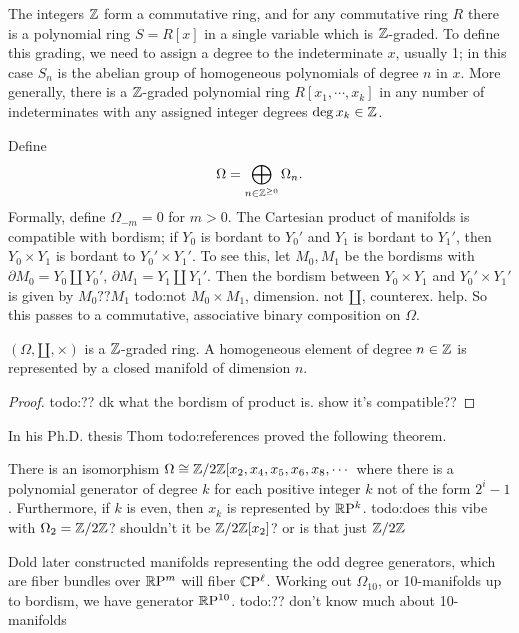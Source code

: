 \begin{example}
    The integers $\mathbb{Z}$ form a commutative ring, and for any commutative ring $R$ there is a polynomial ring $S=R[x]$ in a single variable which is $\mathbb{Z}$-graded. To define this grading, we need to assign a degree to the indeterminate $x$, usually 1; in this case $S_n $ is the abelian group of homogeneous polynomials of degree $n$ in $x$. More generally, there is a $\mathbb{Z}$-graded polynomial ring $R[x_1,\cdots ,x_k]$ in any number of indeterminates with any assigned integer degrees $\deg x_k \in \mathbb{Z}$.
\end{example}
    Define \[
    \Omega=\bigoplus _{n \in \mathbb{Z}^{\geq 0}}\Omega_n .
    \] Formally, define $\Omega_{-m}=0$ for $m>0$. The Cartesian product of manifolds is compatible with bordism; if $Y_0$ is bordant to $Y_0'$ and $Y_1$ is bordant to $Y_1'$, then $Y_0 \times Y_1$ is bordant to $Y_0' \times Y_1'$. To see this, let $M_0,M_1$ be the bordisms with $\partial M_0=Y_0\amalg Y_0'$, $\partial M_1=Y_1\amalg Y_1'$. Then the bordism between $Y_0 \times Y_1$ and $Y_0' \times Y_1'$ is given by $M_0 ?? M_1$ {\color{red}todo:not $M_0 \times M_1$, dimension. not $\amalg$, counterex. help}. So this passes to a commutative, associative binary composition on $\Omega$.
    \begin{prop}
        $(\Omega,\amalg, \times )$ is a $\mathbb{Z}$-graded ring. A homogeneous element of degree $n \in \mathbb{Z}$ is represented by a closed manifold of dimension $n$.
    \end{prop}
    \begin{proof}
        {\color{red}todo:?? dk what the bordism of product is. show it's compatible??} 
    \end{proof}
    In his Ph.D. thesis Thom {\color{red}todo:references} proved the following theorem.
    \begin{theorem}[Thom]
        There is an isomorphism $\Omega \cong \mathbb{Z} /2 \mathbb{Z} [x_2,x_4, x_5,x_6, x_8,\cdots $ where there is a polynomial generator of degree $k$ for each positive integer $k$ not of the form $2^i -1$. Furthermore, if $k$ is even, then $x_k$ is represented by $\mathbb{R} \mathrm P^k$. {\color{red}todo:does this vibe with $\Omega_2=\mathbb{Z} /2\mathbb{Z}$? shouldn't it be $\mathbb{Z} /2\mathbb{Z}[x_2]$? or is that just $\mathbb{Z} /2\mathbb{Z}$} 
    \end{theorem}
    Dold later constructed manifolds representing the odd degree generators, which are fiber bundles over $\mathbb{R} \mathrm P^m$ will fiber $\mathbb{C} \mathrm{P}^{\ell} $. Working out $\Omega_{10}$, or 10-manifolds up to bordism, we have generator $\mathbb{R}\mathrm{P}^{10}$. {\color{red}todo:?? don't know much about 10-manifolds} 

